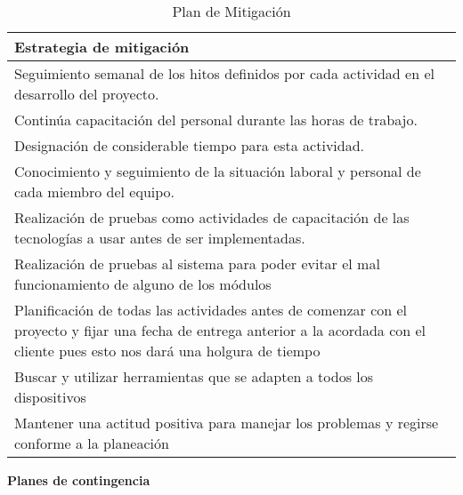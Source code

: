 \begin{table}[h]
	\begin{center}
		\begin{tabular}{|p{14.2cm}|}
			\hline \rowcolor[RGB]{51,153,255} 
				\textcolor{blanco}{\bf Estrategia de mitigación} \\ 
			\hline 
				Seguimiento semanal de los hitos definidos por cada actividad en el desarrollo del proyecto. \\
      		\hline \rowcolor[RGB]{240,248,255} 
				Continúa capacitación del personal durante las horas de trabajo. \\
			\hline 
				Designación de considerable tiempo para esta actividad. \\ 
			\hline \rowcolor[RGB]{240,248,255}
				Conocimiento y seguimiento de la situación laboral y personal de cada miembro del equipo. \\ 
			\hline 
				Realización de pruebas como actividades de capacitación de las tecnologías a usar antes de ser implementadas. \\ 
			\hline \rowcolor[RGB]{240,248,255}
				Realización de pruebas al sistema para poder evitar el mal funcionamiento de alguno de los módulos \\ 
			\hline
				Planificación de todas las actividades antes de comenzar con el proyecto y fijar una fecha de entrega anterior a la acordada con el cliente pues esto nos dará una holgura de tiempo \\ 
			\hline \rowcolor[RGB]{240,248,255}
				Buscar y utilizar herramientas que se adapten a todos los dispositivos \\ 
			\hline
				Mantener una actitud positiva para manejar  los problemas y regirse conforme a la planeación \\ 
			\hline
		\end{tabular}
	\end{center}
	\caption[Plan de Mitigación]{Plan de Mitigación} 
	\label{tab:planMitigacion}
\end{table}

\textbf{Planes de contingencia}
\newline

